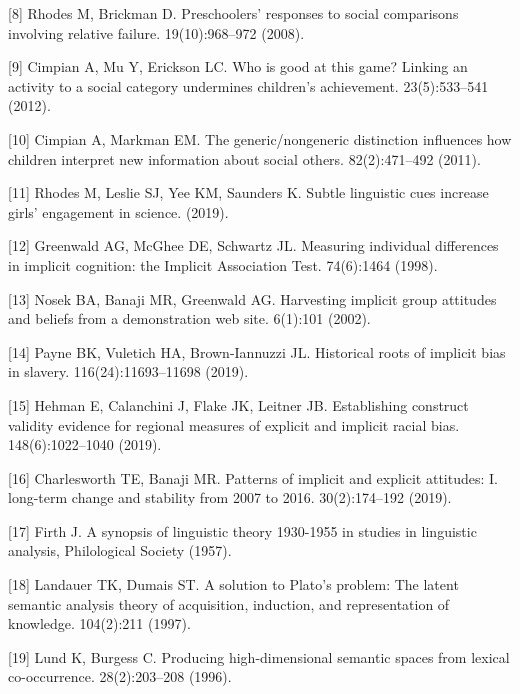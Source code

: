 \documentclass[9pt,twocolumn]{pnas-new}
\begin{document}
[8] Rhodes M, Brickman D. Preschoolers' responses to social comparisons
  involving relative failure.
 19(10):968--972 (2008).

[9] Cimpian A, Mu Y, Erickson LC. Who is good at this game? {L}inking an
  activity to a social category undermines children's achievement.
 23(5):533--541  (2012).

[10] Cimpian A, Markman EM. The generic/nongeneric distinction influences how
  children interpret new information about social others.
 82(2):471--492  (2011).

[11] Rhodes M, Leslie SJ, Yee KM, Saunders K. Subtle linguistic cues increase
  girls' engagement in science.
 (2019).

[12] Greenwald AG, McGhee DE, Schwartz JL.  Measuring individual differences in
  implicit cognition: the {I}mplicit {A}ssociation {T}est.
 74(6):1464  (1998).

[13] Nosek BA, Banaji MR, Greenwald AG. Harvesting implicit group attitudes
  and beliefs from a demonstration web site.
 6(1):101  (2002).

[14] Payne BK, Vuletich HA, Brown-Iannuzzi JL. Historical roots of implicit
  bias in slavery.
  116(24):11693--11698  (2019).

[15] Hehman E, Calanchini J, Flake JK, Leitner JB. Establishing construct
  validity evidence for regional measures of explicit and implicit racial bias.
 148(6):1022--1040  (2019).

[16]  Charlesworth TE, Banaji MR. Patterns of implicit and explicit attitudes:
  I. long-term change and stability from 2007 to 2016.
 30(2):174--192 (2019).

[17] Firth J. A synopsis of linguistic theory 1930-1955 in studies in
  linguistic analysis, {P}hilological {S}ociety (1957).

[18] Landauer TK, Dumais ST. A solution to {P}lato's problem: The latent
  semantic analysis theory of acquisition, induction, and representation of
  knowledge.
 104(2):211 (1997).

[19] Lund K, Burgess C. Producing high-dimensional semantic spaces from
  lexical co-occurrence.
  28(2):203--208  (1996).
\end{document}
